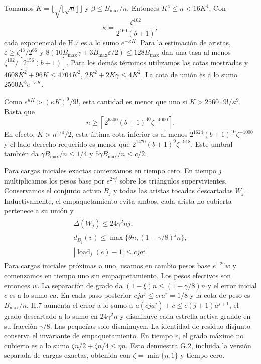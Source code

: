 \documentclass[spanish,11pt,a4paper]{article}
\begin{document}
Tomamos \(K=\lfloor\sqrt{\lfloor\sqrt n\rfloor}\rfloor\) y \(\beta\le B_{\max}/n\). Entonces \(K^4\le n<16K^4\). Con \[\kappa=\frac{\zeta^{102}}{2^{160}(b+1)},\] cada exponencial de H.7 es a lo sumo \(e^{-\kappa K}\). Para la estimación de aristas, \(\varepsilon\ge\zeta^{43}/2^{66}\) y \(8(10B_{\max}\gamma+3B_{\max}\varepsilon/2)\le128B_{\max}\) dan una tasa al menos \(\zeta^{102}/[2^{156}(b+1)]\). Para los demás términos utilizamos las cotas mostradas y \(4608K^2+96K\le4704K^2\), \(2K^2+2K\gamma\le4K^2\). La cota de unión es a lo sumo \(2560K^8e^{-\kappa K}\).

Como \(e^{\kappa K}>(\kappa K)^9/9!\), esta cantidad es menor que uno si \(K>2560\cdot9!/\kappa^9\). Basta que \[n\ge\left\lceil2^{6500}(b+1)^{40}\zeta^{-4000}\right\rceil.\] En efecto, \(K>n^{1/4}/2\), esta última cota inferior es al menos \(2^{1624}(b+1)^{10}\zeta^{-1000}\) y el lado derecho requerido es menor que \(2^{1470}(b+1)^9\zeta^{-918}\). Este umbral también da \(\gamma B_{\max}/n\le1/4\) y \(5\gamma B_{\max}/n\le c/2\).

Para cargas iniciales exactas comenzamos en tiempo cero. En tiempo \(j\) multiplicamos los pesos base por \(e^{2\gamma j}\) sobre los triángulos supervivientes. Conservamos el conjunto activo \(B_j\) y todas las aristas tocadas descartadas \(W_j\). Inductivamente, el empaquetamiento evita ambos, cada arista no cubierta pertenece a su unión y \[\begin{gathered}
\begin{gathered}
\Delta(W_j)\le24\gamma^2nj,\\
d_{B_j}(v)\le\max\{\theta n,(1-\gamma/8)^jn\},\\
|\operatorname{load}_j(e)-1|\le cja^j.
\end{gathered}
\end{gathered}\] Para cargas iniciales próximas a uno, usamos en cambio pesos base \(e^{-2\gamma}w\) y comenzamos en tiempo uno sin empaquetamiento. Los pesos efectivos son entonces \(w\). La separación de grado da \((1-\xi)n\le(1-\gamma/8)n\) y el error inicial \(c\) es a lo sumo \(ca\). En cada paso posterior \(cja^j\le cra^r=1/8\) y la cota de peso es \(B_{\max}/n\). H.7 aumenta el error a lo sumo a \(a(cja^j)+c\le c(j+1)a^{j+1}\), el grado descartado a lo sumo en \(24\gamma^2n\) y disminuye cada estrella activa grande en su fracción \(\gamma/8\). Las pequeñas solo disminuyen. La identidad de residuo disjunto conserva el invariante de empaquetamiento. En tiempo \(r\), el grado máximo no cubierto es a lo sumo \(\zeta n/2+\zeta n/4\le\eta n\). Esto demuestra G.2, incluida la versión separada de cargas exactas, obtenida con \(\zeta=\min\{\eta,1\}\) y tiempo cero.
\end{document}
